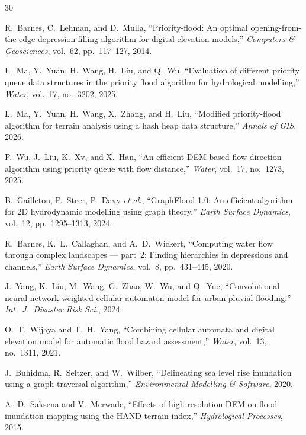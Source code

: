 \documentclass[conference]{IEEEtran}
\begin{document}
\begin{thebibliography}{30}

R.~Barnes, C.~Lehman, and D.~Mulla,
``Priority-flood: An optimal opening-from-the-edge depression-filling
algorithm for digital elevation models,''
\textit{Computers \& Geosciences}, vol.~62, pp.~117--127, 2014.

L.~Ma, Y.~Yuan, H.~Wang, H.~Liu, and Q.~Wu,
``Evaluation of different priority queue data structures in the priority flood
algorithm for hydrological modelling,''
\textit{Water}, vol.~17, no.~3202, 2025.

L.~Ma, Y.~Yuan, H.~Wang, X.~Zhang, and H.~Liu,
``Modified priority-flood algorithm for terrain analysis using a hash heap
data structure,''
\textit{Annals of GIS}, 2026.

P.~Wu, J.~Liu, K.~Xv, and X.~Han,
``An efficient DEM-based flow direction algorithm using priority queue with
flow distance,''
\textit{Water}, vol.~17, no.~1273, 2025.

B.~Gailleton, P.~Steer, P.~Davy \textit{et al.},
``GraphFlood 1.0: An efficient algorithm for 2D hydrodynamic modelling using
graph theory,''
\textit{Earth Surface Dynamics}, vol.~12, pp.~1295--1313, 2024.

R.~Barnes, K.~L.~Callaghan, and A.~D.~Wickert,
``Computing water flow through complex landscapes --- part~2: Finding
hierarchies in depressions and channels,''
\textit{Earth Surface Dynamics}, vol.~8, pp.~431--445, 2020.

J.~Yang, K.~Liu, M.~Wang, G.~Zhao, W.~Wu, and Q.~Yue,
``Convolutional neural network weighted cellular automaton model for urban
pluvial flooding,''
\textit{Int.\ J.\ Disaster Risk Sci.}, 2024.

O.~T.~Wijaya and T.~H.~Yang,
``Combining cellular automata and digital elevation model for automatic flood
hazard assessment,''
\textit{Water}, vol.~13, no.~1311, 2021.

J.~Buhidma, R.~Seltzer, and W.~Wilber,
``Delineating sea level rise inundation using a graph traversal algorithm,''
\textit{Environmental Modelling \& Software}, 2020.

A.~D.~Saksena and V.~Merwade,
``Effects of high-resolution DEM on flood inundation mapping using the HAND
terrain index,''
\textit{Hydrological Processes}, 2015.


\end{thebibliography}
\end{document}
